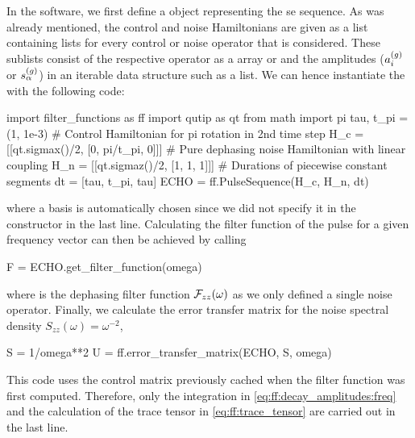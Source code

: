 In the software, we first define a \pulsesequence object representing the \gls{se} sequence.
As was already mentioned, the control and noise Hamiltonians are given as a list containing lists for every control or noise operator that is considered.
These sublists consist of the respective operator as a \numpy array or \qutip \qobj and the amplitudes ($a_i^{(g)}$ or $s_\alpha^{(g)}$) in an iterable data structure such as a list.
We can hence instantiate the \pulsesequence with the following code:
\begin{pycode}
    import filter_functions as ff
    import qutip as qt
    from math import pi
    tau, t_pi = (1, 1e-3)
    # Control Hamiltonian for pi rotation in 2nd time step
    H_c = [[qt.sigmax()/2, [0, pi/t_pi, 0]]]
    # Pure dephasing noise Hamiltonian with linear coupling
    H_n = [[qt.sigmaz()/2, [1, 1, 1]]]
    # Durations of piecewise constant segments
    dt = [tau, t_pi, tau]
    ECHO = ff.PulseSequence(H_c, H_n, dt)
\end{pycode}
where a basis is automatically chosen since we did not specify it in the constructor in the last line.
Calculating the filter function of the pulse for a given frequency vector  can then be achieved by calling
\begin{pycode}
    F = ECHO.get_filter_function(omega)
\end{pycode}
where  is the dephasing filter function $\mathcal{F}_{zz}(\omega)$ as we only defined a single noise operator.
Finally, we calculate the error transfer matrix \liouvUe for the noise spectral density $S_{zz}(\omega) = \omega^{-2}$,
\begin{pycode}
    S = 1/omega**2
    U = ff.error_transfer_matrix(ECHO, S, omega)
\end{pycode}
This code uses the control matrix previously cached when the filter function was first computed.
Therefore, only the integration in \cref{eq:ff:decay_amplitudes:freq} and the calculation of the trace tensor in \cref{eq:ff:trace_tensor} are carried out in the last line.

